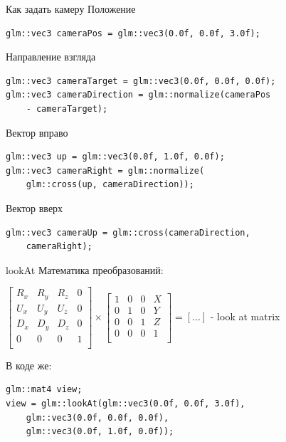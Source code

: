 \documentclass[aspectration=1610,t]{beamer}
\begin{document}
\begin{frame}[fragile]{Как задать камеру}
    Положение
            {\small \begin{lstlisting}
glm::vec3 cameraPos = glm::vec3(0.0f, 0.0f, 3.0f);
            \end{lstlisting}}

    Направление взгляда
        {\small \begin{lstlisting}
glm::vec3 cameraTarget = glm::vec3(0.0f, 0.0f, 0.0f);
glm::vec3 cameraDirection = glm::normalize(cameraPos 
    - cameraTarget);
        \end{lstlisting}}

    Вектор вправо
        {\small \begin{lstlisting}
glm::vec3 up = glm::vec3(0.0f, 1.0f, 0.0f); 
glm::vec3 cameraRight = glm::normalize(
    glm::cross(up, cameraDirection));
        \end{lstlisting}}
    
    Вектор вверх
        {\small \begin{lstlisting}
glm::vec3 cameraUp = glm::cross(cameraDirection,
    cameraRight);
        \end{lstlisting}}
\end{frame}

\begin{frame}[fragile]{lookAt}
    Математика преобразований:

    $
        \begin{bmatrix}
            R_x & R_y & R_z & 0 \\
            U_x & U_y & U_z & 0 \\
            D_x & D_y & D_z & 0 \\
            0 & 0 & 0 & 1 \\
        \end{bmatrix}
        \times
        \begin{bmatrix}
            1 & 0 & 0 & X \\
            0 & 1 & 0 & Y \\
            0 & 0 & 1 & Z \\
            0 & 0 & 0 & 1 \\
        \end{bmatrix}
        = [...]
    $ - look at matrix

    В коде же:
            {\small \begin{lstlisting}
glm::mat4 view;
view = glm::lookAt(glm::vec3(0.0f, 0.0f, 3.0f), 
    glm::vec3(0.0f, 0.0f, 0.0f), 
    glm::vec3(0.0f, 1.0f, 0.0f));
            \end{lstlisting}}
\end{frame}
\end{document}
